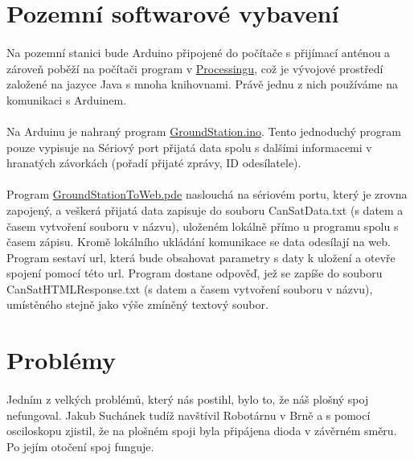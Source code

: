 \documentclass[a4paper]{report}
\begin{document}
\section{Pozemní softwarové vybavení}
\paragraph{} Na pozemní stanici bude Arduino připojené do počítače s přijímací anténou a zároveň poběží na počítači program v \href{https://processing.org/}{Processingu}, což je vývojové prostředí založené na jazyce Java s mnoha knihovnami. Právě jednu z nich používáme na komunikaci s Arduinem.
\paragraph{} Na Arduinu je nahraný program \href{https://github.com/suchanekj/CanSatGOSA/blob/master/Code/GroundStation/GroundStation.ino}{GroundStation.ino}. Tento jednoduchý program pouze vypisuje na Sériový port přijatá data spolu s dalšími informacemi v hranatých závorkách (pořadí přijaté zprávy, ID odesílatele).
\paragraph{} Program  \href{https://github.com/suchanekj/CanSatGOSA/blob/master/Code/GroundStation/GroundStationToWeb.pde}{GroundStationToWeb.pde} naslouchá na sériovém portu, který je zrovna zapojený, a veškerá přijatá data zapisuje do souboru CanSatData.txt (s datem a časem vytvoření souboru v názvu), uloženém lokálně přímo u programu spolu s časem zápisu. Kromě lokálního ukládání komunikace se data odesílají na web. Program sestaví url, která bude obsahovat parametry s daty k uložení a otevře spojení pomocí této url. Program dostane odpověď, jež se zapíše do souboru CanSatHTMLResponse.txt (s datem a časem vytvoření souboru v názvu), umístěného stejně jako výše zmíněný textový soubor.

\section{Problémy}
\paragraph{} Jedním z velkých problémů, který nás postihl, bylo to, že náš plošný spoj nefungoval. Jakub Suchánek tudíž navštívil Robotárnu v Brně a s pomocí osciloskopu zjistil, že na plošném spoji byla připájena dioda v závěrném směru. Po jejím otočení spoj funguje.
\end{document}
